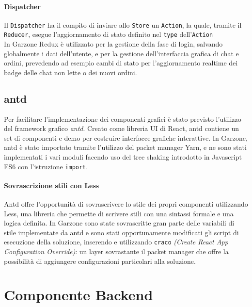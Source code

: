 \paragraph{Dispatcher} Il \lstinline[basicstyle=\ttfamily]!Dispatcher! ha il compito di inviare allo \lstinline[basicstyle=\ttfamily]!Store! un \lstinline[basicstyle=\ttfamily]!Action!, la quale, tramite il \lstinline[basicstyle=\ttfamily]!Reducer!, esegue l'aggiornamento di stato definito nel \lstinline[basicstyle=\ttfamily]!type! dell'\lstinline[basicstyle=\ttfamily]!Action!
\\[12pt]
In Garzone Redux è utilizzato per la gestione della fase di login, salvando globalmente i dati dell'utente, e per la gestione dell'interfaccia grafica di chat e ordini, prevedendo ad esempio cambi di stato per l'aggiornamento realtime dei badge delle chat non lette o dei nuovi ordini.
\subsection{antd}
Per facilitare l'implementazione dei componenti grafici è stato previsto l'utilizzo del framework grafico \textit{antd}. Creato come libreria UI di React, antd contiene un set di componenti e demo per costruire interfacce grafiche interattive\cite{ANTD}. In Garzone, antd è stato importato tramite l'utilizzo del packet manager Yarn, e ne sono stati implementati i vari moduli facendo uso del tree shaking introdotto in Javascript ES6 con l'istruzione \lstinline[basicstyle=\ttfamily]!import!.
\paragraph{Sovrascrizione stili con Less} Antd offre l'opportunità di sovrascrivere lo stile dei propri componenti utilizzando Less, una libreria che permette di scrivere stili con una sintassi formale e una logica definita. In Garzone sono state sovrascritte gran parte delle variabili di stile implementate da antd e sono stati opportunamente modificati gli script di esecuzione della soluzione, inserendo e utilizzando \lstinline[basicstyle=\ttfamily]!craco! \textit{(Create React App Configuration Override)}: un layer sovrastante il packet manager che offre la possibilità di aggiungere configurazioni particolari alla soluzione. 
\newpage
\section{Componente Backend}

